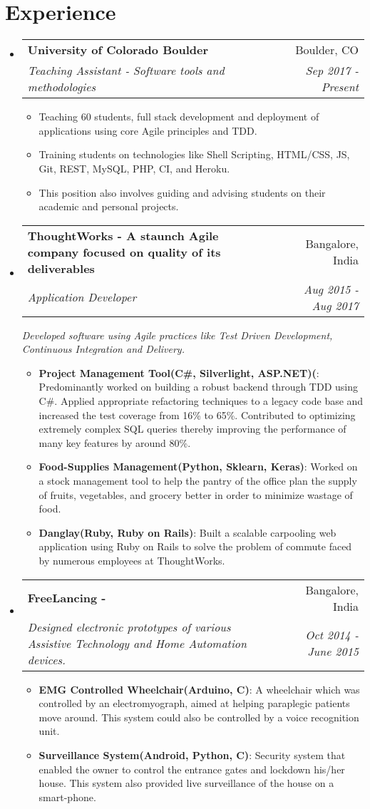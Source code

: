 \documentclass[letterpaper,11pt]{article}
\makeatletter
\newcommand{\resumeItem}[2]{
  \item\small{
    \textbf{#1}{: #2 \vspace{-2pt}}
  }
}
\newcommand{\resumePoint}[1]{
  \item\small{#1}
}
\newcommand{\resumeSubheading}[4]{
  \vspace{-1pt}\item
    \begin{tabular*}{0.97\textwidth}{l@{\extracolsep{\fill}}r}
      \textbf{#1} & #2 \\
      \textit{\small#3} & \textit{\small #4} \\
    \end{tabular*}\vspace{-2pt}
}
\newcommand{\resumeSubheadingWithDescription}[5]{
  \vspace{-1pt}\item
    \begin{tabular*}{0.97\textwidth}{l@{\extracolsep{\fill}}r}
      \textbf{#1} & #2 \\
      \textit{\small#3} & \textit{\small #4} \\
    \end{tabular*}\vspace{2pt}
    \textit{\small#5}\vspace{0pt}
}
\newcommand{\resumeSubHeadingListStart}{\begin{itemize}[leftmargin=*]}
\newcommand{\resumeSubHeadingListEnd}{\end{itemize}\vspace{-10pt}}
\newcommand{\resumeItemListStart}{\begin{itemize}\vspace{-4pt}}
\newcommand{\resumeItemListEnd}{\end{itemize}\vspace{-5pt}}
\makeatother
\begin{document}

\section{Experience}
  \resumeSubHeadingListStart
    \resumeSubheading
      {University of Colorado Boulder}{Boulder, CO}
      {Teaching Assistant - Software tools and methodologies}{Sep 2017 - Present}
      \resumeItemListStart
          \resumePoint{Teaching 60 students, full stack development and deployment of applications using core Agile principles and TDD.
          }
          \resumePoint{Training students on technologies like Shell Scripting, HTML/CSS, JS, Git, REST, MySQL, PHP, CI, and Heroku.
          }
          \resumePoint{This position also involves guiding and advising students on their academic and personal projects.
          }
      \resumeItemListEnd
    \resumeSubheadingWithDescription
      {ThoughtWorks - \normalfont A staunch Agile company focused on quality of its deliverables}{Bangalore, India}
      {Application Developer}{Aug 2015 - Aug 2017}
      {Developed software using Agile practices like Test Driven Development, Continuous Integration and Delivery.}
      \resumeItemListStart
      \resumeItem{Project Management Tool(C\#, Silverlight, ASP.NET)(\normalfont{for the largest consulting firm in the world)}}
      {Predominantly worked on building a robust backend through TDD using C\#. Applied appropriate refactoring techniques to a legacy code base and increased the test coverage from 16\% to 65\%. Contributed to optimizing extremely complex SQL queries thereby improving the performance of many key features by around 80\%.}
      \resumeItem{Food-Supplies Management(Python, Sklearn, Keras)}{Worked on a stock management tool to help the pantry of the office plan the supply of fruits, vegetables, and grocery better in order to minimize wastage of food.}
      \resumeItem{Danglay(Ruby, Ruby on Rails)}{Built a scalable carpooling web application using Ruby on Rails to solve the problem of commute faced by numerous employees at ThoughtWorks.}
      \resumeItemListEnd
    \resumeSubheading
      {FreeLancing - \normalfont{Embedded System Prototyping}}{Bangalore, India}
      {Designed electronic prototypes of various Assistive Technology and Home Automation devices.}{Oct 2014 - June 2015}
      \resumeItemListStart
          \resumeItem{EMG Controlled Wheelchair(Arduino, C)}{A wheelchair which was controlled by an electromyograph, aimed at helping paraplegic patients move around. This system could also be controlled by a voice recognition unit.}
          \resumeItem{Surveillance System(Android, Python, C)}{Security system that enabled the owner to control the entrance gates and lockdown his/her house. This system also provided live surveillance of the house on a smart-phone.}
      \resumeItemListEnd
  \resumeSubHeadingListEnd
\end{document}
